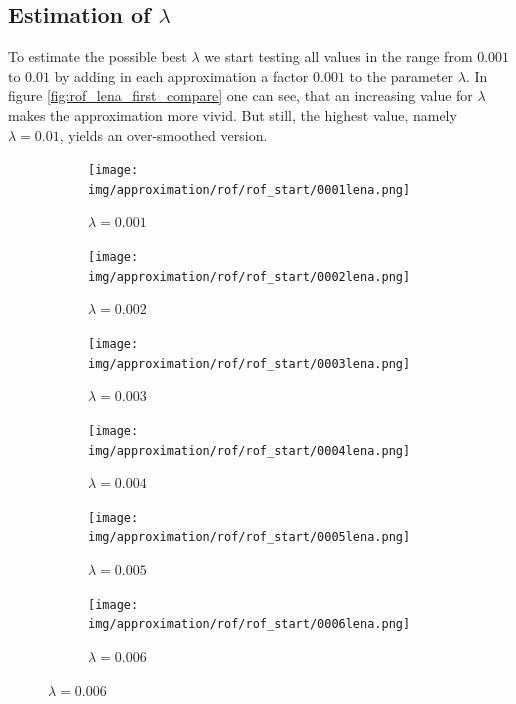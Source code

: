 \documentclass{scrreprt}
\begin{document}
        \subsection{Estimation of $\lambda$}
        \label{sub:estimation_of_lambda_rof}

            To estimate the possible best $\lambda$ we start testing all values in the range from $0.001$ to $0.01$ by adding in each approximation a factor $0.001$ to the parameter $\lambda$. In figure \ref{fig:rof_lena_first_compare} one can see, that an increasing value for $\lambda$ makes the approximation more vivid. But still, the highest value, namely $\lambda = 0.01$, yields an over-smoothed version.

            \begin{figure}[!ht]
                \centering
                \begin{subfigure}[b]{0.18\textwidth}
                    \texttt{[image: img/approximation/rof/rof\_start/0001lena.png]}
                    \caption{$\lambda = 0.001$}
                \end{subfigure}
                \begin{subfigure}[b]{0.18\textwidth}
                    \texttt{[image: img/approximation/rof/rof\_start/0002lena.png]}
                    \caption{$\lambda = 0.002$}
                \end{subfigure}
                \begin{subfigure}[b]{0.18\textwidth}
                    \texttt{[image: img/approximation/rof/rof\_start/0003lena.png]}
                    \caption{$\lambda = 0.003$}
                \end{subfigure}
                \begin{subfigure}[b]{0.18\textwidth}
                    \texttt{[image: img/approximation/rof/rof\_start/0004lena.png]}
                    \caption{$\lambda = 0.004$}
                \end{subfigure}
                \begin{subfigure}[b]{0.18\textwidth}
                    \texttt{[image: img/approximation/rof/rof\_start/0005lena.png]}
                    \caption{$\lambda = 0.005$}
                \end{subfigure}
                \begin{subfigure}[b]{0.18\textwidth}
                    \texttt{[image: img/approximation/rof/rof\_start/0006lena.png]}
                    \caption{$\lambda = 0.006$}
                \end{subfigure}

\end{figure}
\end{document}

